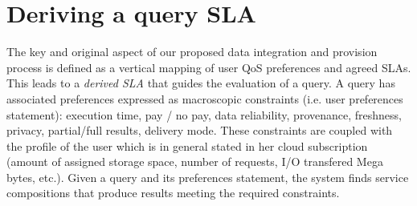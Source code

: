 \section{Deriving a query SLA}
\label{sec:slaModel}

%

The key and original aspect of   our proposed data integration and provision process is  defined as a vertical mapping of user QoS preferences and agreed SLAs. This  leads to a {\em derived SLA} that guides the evaluation of a query. A query has associated preferences  expressed as macroscopic constraints (i.e. user preferences statement): execution time, pay / no pay, data reliability, provenance, freshness, privacy, partial/full results, delivery mode. These constraints are coupled with the profile of the user which is in general stated in her cloud subscription (amount of assigned storage space, number of requests, I/O transfered Mega bytes, etc.). Given a query and its preferences statement, the system  finds  service compositions that produce results   meeting the required constraints. 


